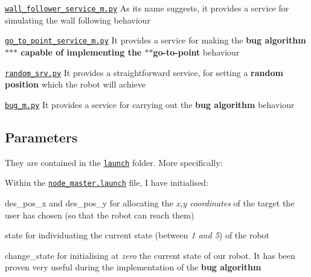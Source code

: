 \begin{DoxyEnumerate}
\item \href{https://github.com/fedehub/final_assignment/tree/main/scripts/wall_follower_service_m.py}{\tt wall\+\_\+follower\+\_\+service\+\_\+m.\+py} As its name suggests, it provides a service for simulating the wall following behaviour
\item \href{https://github.com/fedehub/final_assignment/tree/main/scripts/go_to_point_service_m.py}{\tt go\+\_\+to\+\_\+point\+\_\+service\+\_\+m.\+py} It provides a service for making the {\bfseries bug algorithm$\ast$$\ast$$\ast$ capable of implementing the $\ast$$\ast$go-\/to-\/point} behaviour
\item \href{https://github.com/fedehub/final_assignment/tree/main/scripts/random_srv.py}{\tt random\+\_\+srv.\+py} It provides a straightforward service, for setting a {\bfseries random position} which the robot will achieve
\item \href{https://github.com/fedehub/final_assignment/tree/main/scripts/bug_m.py}{\tt bug\+\_\+m.\+py} It provides a service for carrying out the {\bfseries bug algorithm} behaviour
\end{DoxyEnumerate}

\subsection*{Parameters}

They are contained in the \href{https://github.com/fedehub/final_assignment/tree/main/launch}{\tt launch} folder. More specifically\+:


\begin{DoxyItemize}
\item Within the \href{https://github.com/fedehub/final_assignment/blob/main/launch/node_master.launch}{\tt node\+\_\+master.\+launch} file, I have initialised\+:
\begin{DoxyItemize}
\item {\ttfamily des\+\_\+pos\+\_\+x} and {\ttfamily des\+\_\+pos\+\_\+y} for allocating the {\itshape x,y coordinates} of the target the user has chosen (so that the robot can reach them)
\item {\ttfamily state} for individuating the current state (between {\itshape 1 and 5}) of the robot
\item {\ttfamily change\+\_\+state} for initialising at {\itshape zero} the current state of our robot. It has been proven very useful during the implementation of the {\bfseries bug algorithm}
\end{DoxyItemize}
\end{DoxyItemize}


